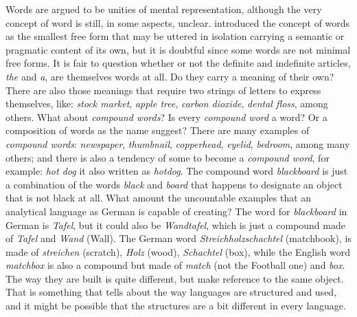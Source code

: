 Words are argued to be unities of mental representation,
although the very concept of word is still, in some aspects, unclear.
\cite{bloomfield1926} introduced the concept of words as the 
smallest free form that may be uttered in isolation carrying a semantic 
or pragmatic content of its own, but it is doubtful since some words are not minimal free forms.
It is fair to question whether or not
the definite and indefinite articles, \textit{the} and \textit{a}, are themselves words at all.
Do they carry a meaning of their own? 
There are also those meanings that require two strings of letters to express themselves, like: 
\textit{stock market}, \textit{apple tree}, \textit{carbon dioxide}, \textit{dental floss}, among others. 
What about \textit{compound words}? Is every \textit{compound word}
a word? Or a composition of words as the name suggest? 
There are many examples of \textit{compound words}: \textit{newspaper}, \textit{thumbnail},
\textit{copperhead}, \textit{eyelid}, \textit{bedroom}, among many others;
and there is also a tendency of some to become a \textit{compound word}, for example:
\textit{hot dog} it also written as \textit{hotdog}.
The compound word \textit{blackboard}
is just a combination of the words \textit{black} and \textit{board} that happens to designate
an object that is not black at all. What amount the uncountable examples that an analytical language
as German is capable of creating? The word for \textit{blackboard} in German is \textit{Tafel}, but
it could also be \textit{Wandtafel}, which is just a compound made of \textit{Tafel} and \textit{Wand}
(Wall). The German word \textit{Streichholzschachtel} (matchbook), is made of
\textit{streichen} (scratch), \textit{Holz} (wood), \textit{Schachtel} (box), while the English
word \textit{matchbox} is also a compound but made of \textit{match} (not the Football one) and
\textit{box}. The way they are built is quite different, but make reference to the same object.
That is something that tells about the way languages are structured and used, and it might be
possible that the structures are a bit different in every language. 

